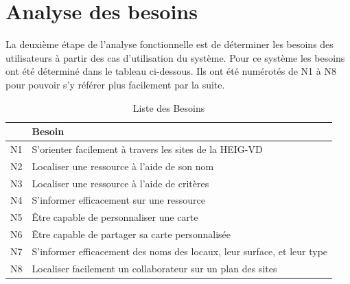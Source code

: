 \documentclass[
    iai, %
    il, %
]{heig-tb}
\begin{document}
\section{Analyse des besoins}
La deuxième étape de l'analyse fonctionnelle est de déterminer les besoins des utilisateurs à partir des cas d'utilisation du système.
Pour ce système les besoins ont été déterminé dans le tableau ci-dessous. Ils ont été numérotés de N1 à N8 pour pouvoir s'y référer plus facilement par la suite.
\begin{table}[H]
    \begin{center}
        \caption{Liste des Besoins \label{besoins}}
        \begin{tabular}{l|l}
               & Besoin                                                                  \\ \hline
            N1 & S'orienter facilement à travers les sites de la HEIG-VD                 \\
            N2 & Localiser une ressource à l'aide de son nom                             \\
            N3 & Localiser une ressource à l'aide de critères                            \\
            N4 & S'informer efficacement sur une ressource                               \\
            N5 & Être capable de personnaliser une carte                                 \\
            N6 & Être capable de partager sa carte personnalisée                         \\
            N7 & S'informer efficacement des noms des locaux, leur surface, et leur type \\
            N8 & Localiser facilement un collaborateur sur un plan des sites
        \end{tabular}
    \end{center}
\end{table}

\newpage
\end{document}
